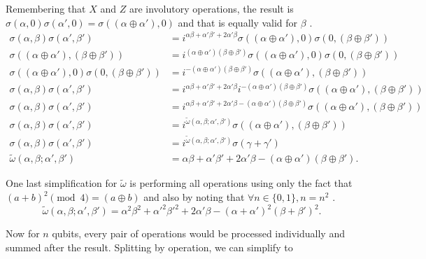 Remembering that $X$ and $Z$ are involutory operations, the result is $\sigma(\alpha,0)\sigma(\alpha',0) = \sigma((\alpha \oplus \alpha'),0)$ and that is equally valid for $\beta$ \citep{Cesar2024}.
\begin{align*}
  \sigma(\alpha, \beta)\sigma(\alpha', \beta') &= i^{\alpha \beta + \alpha'\beta' + 2\alpha'\beta}\sigma((\alpha \oplus \alpha'),0)\sigma(0,(\beta \oplus \beta'))\\
  \sigma((\alpha \oplus \alpha'), (\beta \oplus \beta')) &= i^{(\alpha \oplus \alpha')(\beta \oplus \beta')}\sigma((\alpha \oplus \alpha'),0)\sigma(0,(\beta \oplus \beta'))\\
  \sigma((\alpha \oplus \alpha'),0)\sigma(0,(\beta \oplus \beta')) &= i^{-(\alpha \oplus \alpha')(\beta \oplus \beta')}\sigma((\alpha \oplus \alpha'),(\beta \oplus \beta')) \\
  \sigma(\alpha, \beta)\sigma(\alpha', \beta') &= i^{\alpha \beta + \alpha'\beta' + 2\alpha'\beta}i^{-(\alpha \oplus \alpha')(\beta \oplus \beta')}\sigma((\alpha \oplus \alpha'),(\beta \oplus \beta'))\\
  \sigma(\alpha, \beta)\sigma(\alpha', \beta') &= i^{\alpha \beta + \alpha'\beta' + 2\alpha'\beta - (\alpha \oplus \alpha')(\beta \oplus \beta')} \sigma((\alpha \oplus \alpha'),(\beta \oplus \beta'))\\
  \sigma(\alpha, \beta)\sigma(\alpha', \beta') &= i^{\tilde{\omega}(\alpha, \beta; \alpha', \beta')} \sigma((\alpha \oplus \alpha'),(\beta \oplus \beta'))\\
  \sigma(\alpha, \beta)\sigma(\alpha', \beta') &= i^{\tilde{\omega}(\alpha, \beta; \alpha', \beta')} \sigma(\gamma + \gamma')\\
  \tilde{\omega} (\alpha, \beta; \alpha', \beta') &= \alpha \beta + \alpha'\beta' + 2\alpha'\beta - (\alpha \oplus \alpha')(\beta \oplus \beta')
.\end{align*}

One last simplification for $\tilde{\omega}$ is performing all operations using only the fact that $(a + b)^2 \pmod 4 = (a \oplus b)$ and also by noting that $\forall n \in \{0, 1\}, n = n^2$ \citep{Cesar2024}.
\begin{equation}
  \tilde{\omega} (\alpha, \beta; \alpha', \beta') = \alpha^2 \beta^2 + \alpha'^2\beta'^2 + 2\alpha'\beta - (\alpha + \alpha')^2(\beta + \beta')^2
.\end{equation}

Now for $n$ qubits, every pair of operations would be processed individually and summed after the result. Splitting by operation, we can simplify to

